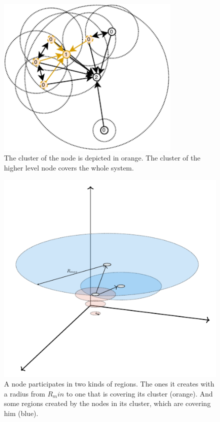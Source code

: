 \documentclass[a4paper,11pt,oneside]{report}
\begin{document}
\begin{figure}[!h] 
\centering
\includegraphics[width=250pt]{figures/ClusterBunch-Cluster}
\caption{ The cluster of the node is depicted in orange. The cluster of the
  higher level node covers the whole system. }
  \label{fig:ClusterBunch-Cluster}
\end{figure}

\begin{figure}[!h] 
\centering
\includegraphics[width=350pt]{figures/regions/ellipsis}
\caption{ A node participates in two kinds of regions. The ones it creates with
  a radius from $R_min$ to one that is covering its cluster (orange). And
  some regions created by the nodes in its cluster, which are covering him
  (blue).} \label{fig:RegionCreation}
\end{figure}
\end{document}
